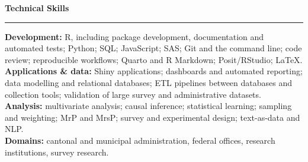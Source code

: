 \documentclass[10pt,a4paper]{article}
\newcommand{\cvsection}[1]{%
  \vspace{0.38em}\par
  {\color{cvblue}\large\bfseries #1}\par
  \vspace{-0.28em}\textcolor{cvblue}{\rule{\linewidth}{0.6pt}}\par
  \vspace{0.26em}}
\begin{document}
\cvsection{Technical Skills}

\textbf{Development:} R, including package development, documentation and automated tests; Python; SQL; JavaScript; SAS; Git and the command line; code review; reproducible workflows; Quarto and R Markdown; Posit/RStudio; \LaTeX.\\
\textbf{Applications \& data:} Shiny applications; dashboards and automated reporting; data modelling and relational databases; ETL pipelines between databases and collection tools; validation of large survey and administrative datasets.\\
\textbf{Analysis:} multivariate analysis; causal inference; statistical learning; sampling and weighting; MrP and MrsP; survey and experimental design; text-as-data and NLP.\\
\textbf{Domains:} cantonal and municipal administration, federal offices, research institutions, survey research.
\end{document}
